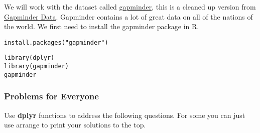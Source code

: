 \documentclass[]{article}
\begin{document}
We will work with the dataset called
\href{https://github.com/jennybc/gapminder}{gapminder}, this is a
cleaned up version from \href{http://www.gapminder.org/data/}{Gapminder
Data}. Gapminder contains a lot of great data on all of the nations of
the world. We first need to install the gapminder package in R.

\begin{verbatim}
install.packages("gapminder")
\end{verbatim}

\begin{verbatim}
library(dplyr)
library(gapminder)
gapminder
\end{verbatim}

\subsubsection{Problems for Everyone}\label{problems-for-everyone}

Use \textbf{dplyr} functions to address the following questions. For
some you can just use arrange to print your solutions to the top.
\end{document}
